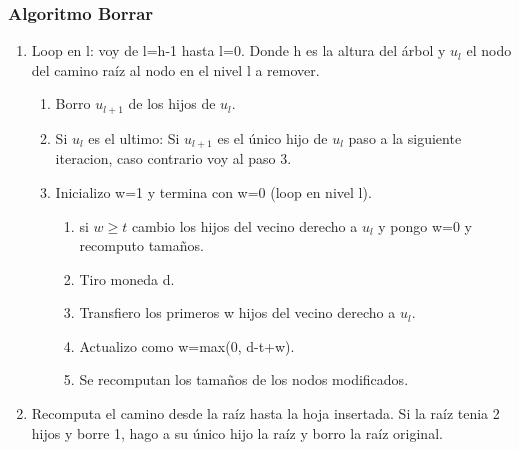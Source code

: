 \documentclass[10pt,handout]{beamer}
\begin{document}
\begin{frame}
\frametitle{Algoritmo Borrar}

 \begin{enumerate}\itemsep-1em
\pause
  \item Loop en l: voy de l=h-1 hasta l=0.
    Donde h es la altura del árbol y $u_l$ el nodo del camino raíz al nodo en el nivel l a remover.
    \vspace{-0.4cm}
    \begin{enumerate}[a]\itemsep-1em
    \item Borro $u_{l+1}$ de los hijos de $u_l$.
\pause
    \item Si $u_l$ es el ultimo: Si $u_{l+1}$ es el único hijo de $u_l$ paso a la siguiente iteracion, caso contrario
      voy al paso 3.
    \item Inicializo w=1 y termina con w=0 (loop en nivel l).
          \vspace{-0.4cm}
      \begin{enumerate}[i]\itemsep-1em
\pause
        \item si $w\geq t$ cambio los hijos del vecino derecho a $u_l$ y pongo w=0 y recomputo  tama\~nos.
        \item Tiro moneda d.
\pause
        \item Transfiero los  primeros w hijos del vecino derecho a $u_l$.
        \item Actualizo como w=max(0, d-t+w).
\pause
        \item Se recomputan los tama\~nos de los nodos modificados.
      \end{enumerate}
  \end{enumerate}
\pause
  \item  Recomputa el camino desde la raíz hasta la hoja insertada.
  Si la raíz tenia 2 hijos y borre 1, hago a su único hijo la raíz y borro la raíz original.
\end{enumerate}
\end{frame}
\end{document}
